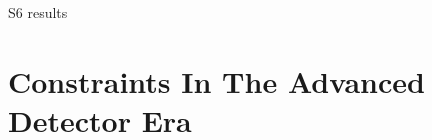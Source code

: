 \documentclass[a0,landscape]{a0poster}
\begin{document}
\begin{multicols}{4}
  \begin{minipage}{\columnwidth}
    \makeatletter
    \newcommand{\@captype}{figure}
    \makeatother
    \centering
    \qquad%
    \caption{S6 results}
  \end{minipage}

\section*{\centering Constraints In The Advanced Detector Era}



\end{multicols}
\end{document}
